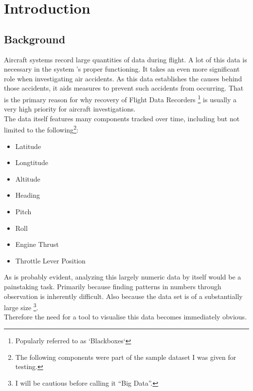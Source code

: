 
\chapter{Introduction} %

\label{ch:introduction} %

\section{Background}

Aircraft systems record large quantities of data during flight. A lot of this data is necessary in the system 's proper functioning. It takes an even more significant role when investigating air accidents.
As this data establishes the causes behind those accidents, it aids measures to prevent such accidents from occurring. That is the primary reason for why recovery of Flight Data Recorders \footnote{Popularly referred to as `Blackboxes`} is usually a very high priority for aircraft investigations.\\

The data itself features many components tracked over time, including but not limited to the following\footnote{The following components were part of the sample dataset I was given for testing.}:
\begin{itemize}
\item Latitude
\item Longtitude
\item Altitude
\item Heading
\item Pitch
\item Roll
\item Engine Thrust
\item Throttle Lever Position
\end{itemize}

As is probably evident, analyzing this largely numeric data by itself would be a painstaking task. Primarily because finding patterns in numbers through observation is inherently difficult. Also because the data set is of a substantially large size \footnote{I will be cautious before calling it ``Big Data''. }. \\

Therefore the need for a tool to visualise this data becomes immediately obvious. \\

